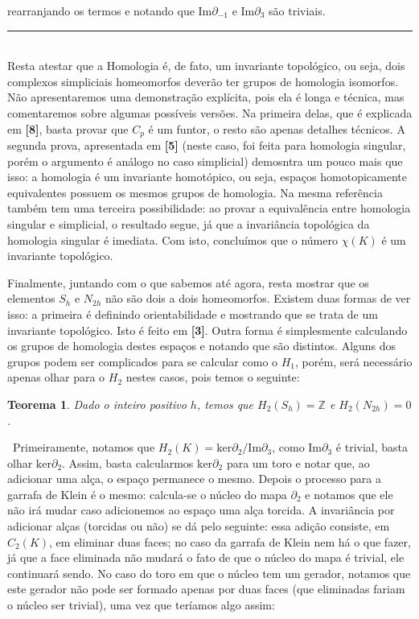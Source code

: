 \documentclass[12pt,a4paper]{article}
\newtheorem{thrm}[mydef]{Teorema}
\def\dem{\par\smallbreak\noindent {\textit{ Demonstração:}} \ }
\def\eop{\hfill\rule{2.5mm}{2.5mm} \\ }
\theoremstyle{definition}
\begin{document}
rearranjando os termos e notando que $\text{Im} \partial_{-1}$ e $\text{Im} \partial_{3}$ são triviais. \eop

Resta atestar que a Homologia é, de fato, um invariante topológico, ou seja, dois complexos simpliciais homeomorfos deverão ter grupos de homologia isomorfos. Não apresentaremos uma demonstração explícita, pois ela é longa e técnica, mas comentaremos sobre algumas possíveis versões. Na primeira delas, que é explicada em \textbf{[8]}, basta provar que $C_p$ é um funtor, o resto são apenas detalhes técnicos. A segunda prova, apresentada em \textbf{[5]} (neste caso, foi feita para homologia singular, porém o argumento é análogo no caso simplicial) demosntra um pouco mais que isso: a homologia é um invariante homotópico, ou seja, espaços homotopicamente equivalentes possuem os mesmos grupos de homologia. Na mesma referência também tem uma terceira possibilidade: ao provar a equivalência entre homologia singular e simplicial, o resultado segue, já que a invariância topológica da homologia singular é imediata. Com isto, concluímos que o número $\chi(K)$ é um invariante topológico.  

Finalmente, juntando com o que sabemos até agora, resta mostrar que os elementos $S_h$ e $N_{2h}$ não são dois a dois homeomorfos. Existem duas formas de ver isso: a primeira é definindo orientabilidade e mostrando que se trata de um invariante topológico. Isto é feito em \textbf{[3]}. Outra forma é simplesmente calculando os grupos de homologia destes espaços e notando que são distintos. Alguns dos grupos podem ser complicados para se calcular como o $H_1$, porém, será necessário apenas olhar para o $H_2$ nestes casos, pois temos o seguinte: 

\begin{thrm}

    Dado o inteiro positivo $h$, temos que $H_2(S_h) = \mathbb{Z}$ e $H_2(N_{2h}) = 0$. 

\end{thrm}

\dem Primeiramente, notamos que $H_2(K)=\text{ker}\partial_2 / \text{Im} \partial_{3}$, como $\text{Im} \partial_{3}$ é trivial, basta olhar $\text{ker}\partial_2$. Assim, basta calcularmos $\text{ker}\partial_2$ para um toro e notar que, ao adicionar uma alça, o espaço permanece o mesmo. Depois o processo para a garrafa de Klein é o mesmo: calcula-se o núcleo do mapa $\partial_2$ e notamos que ele não irá mudar caso adicionemos ao espaço uma alça torcida. A invariância por adicionar alças (torcidas ou não) se dá pelo seguinte: essa adição consiste, em $C_2(K)$, em eliminar duas faces; no caso da garrafa de Klein nem há o que fazer, já que a face eliminada não mudará o fato de que o núcleo do mapa é trivial, ele continuará sendo. No caso do toro em que o núcleo tem um gerador, notamos que este gerador não pode ser formado apenas por duas faces (que eliminadas fariam o núcleo ser trivial), uma vez que teríamos algo assim: 
\end{document}
